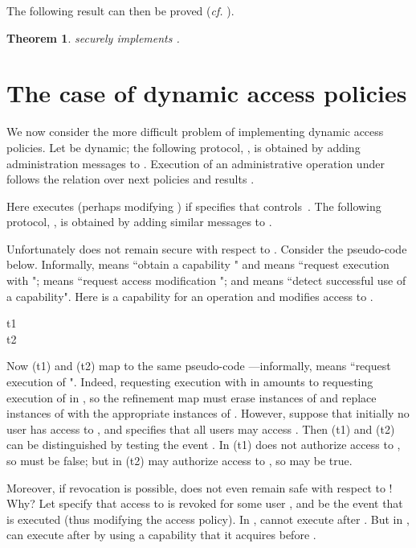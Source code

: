 \documentclass[10pt]{article}
\newtheorem{theorem}{Theorem}
\begin{document}
The following result can then be proved (\emph{cf.} \cite{ChaudhuriAbadi-FMSE05}).
\begin{theorem}\label{thm:static}
 securely implements .
\end{theorem}



\section{The case of dynamic access policies}\label{intro-dyn}
\noindent
We now consider the more difficult problem of implementing dynamic access  policies. 
Let  be dynamic; the following protocol, , is obtained by adding administration messages to . Execution of an administrative operation  under  follows the relation  over next policies  and results . 

Here  executes  (perhaps modifying ) if  specifies that  controls~. 
The following protocol, , is obtained by adding similar messages to .

Unfortunately  does not remain secure with respect to .
Consider the  pseudo-code below. Informally,  means ``obtain a capability " and  means ``request execution with ";  means ``request access modification "; and  means ``detect successful use of a capability". 
Here  is a capability for an operation  and  modifies access to . 
\begin{description}
\item[t1]  
\item[t2] 
\end{description}
Now (t1) and (t2) map to the same  pseudo-code
---informally,  means ``request execution of ". Indeed, requesting execution with  in  amounts to requesting execution of  in , so the refinement map must erase instances of  and replace instances of  with the appropriate instances of .
However, suppose that initially no user has access to , and  specifies that all users may access . Then (t1) and (t2) can be distinguished by testing the event . In (t1)  does not authorize access to , so  must be false; but in (t2)  may authorize access to , so  may be true. 

Moreover, if revocation is possible,  does not even remain safe with respect to ! Why? Let  specify that access to  is revoked for some user , and  be the event that  is executed (thus modifying the access policy). In ,  cannot execute  after . But in ,  can execute  after  by using a capability that it acquires before .  
\end{document}

